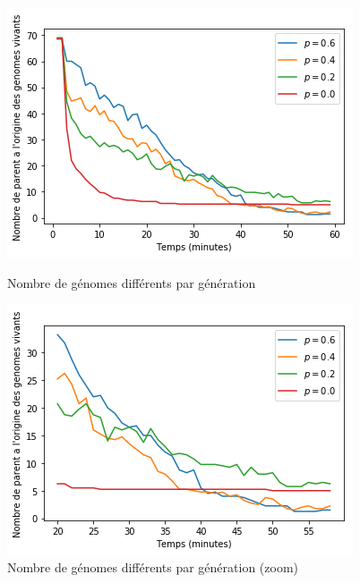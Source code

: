 \documentclass[a4paper]{article}
\begin{document}
\begin{figure}[h]
	\begin{minipage}[c]{.46\linewidth}
		\centering
		\includegraphics[width=1.1\linewidth]{../../script_results/nombre_genome_different.png}
		\caption{Nombre de génomes différents par génération}
	\end{minipage}
	\hfill%
	\begin{minipage}[c]{.46\linewidth}
		\centering
		\includegraphics[width=1.1\linewidth]{../../script_results/nombre_genome_different_zoom.png}
		\caption{Nombre de génomes différents par génération (zoom)}
	\end{minipage}
\end{figure}
\newpage
\end{document}
